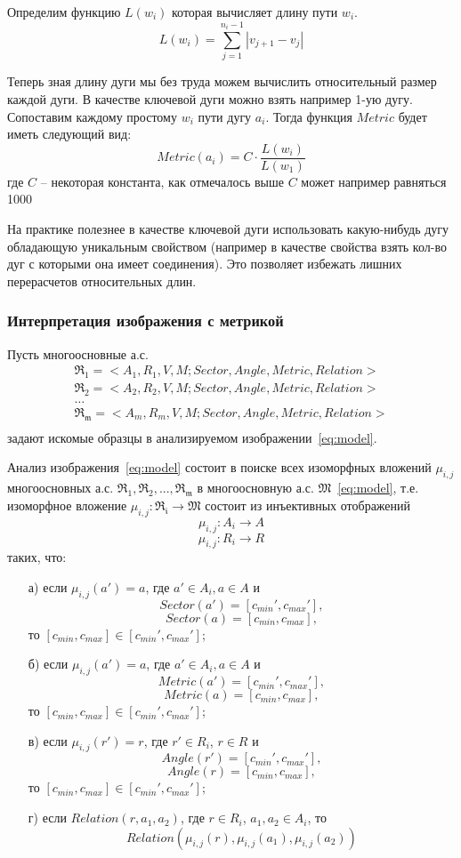 Определим функцию $L(w_i)$ которая вычисляет длину пути $w_i$.
$$L(w_i) = \sum\limits_{j=1}^{n_i-1}|v_{j+1}-v_j|$$

Теперь зная длину дуги мы без труда можем вычислить относительный размер каждой дуги. В качестве ключевой дуги можно взять например 1-ую дугу. Сопоставим каждому простому $w_i$ пути дугу $a_i$. Тогда функция $Metric$ будет иметь следующий вид:
$$Metric(a_i) = C\cdot\frac{L(w_i)}{L(w_1)}$$
где $C$ -- некоторая константа, как отмечалось выше $C$ может например равняться 1000

\begin{remark}
На практике полезнее в качестве ключевой дуги использовать какую-нибудь дугу обладающую уникальным свойством (например в качестве свойства взять кол-во дуг с которыми она имеет соединения). Это позволяет избежать лишних перерасчетов относительных длин. 
\end{remark}

\subsubsection{Интерпретация изображения с метрикой}
\noindent
Пусть многоосновные а.с.
\begin{equation}
	\begin{array}{c}
	\mathfrak{R_1}=<A_1, R_1, V, M; Sector, Angle, Metric, Relation> \\
	\mathfrak{R_2}=<A_2, R_2, V, M; Sector, Angle, Metric, Relation> \\
	\dots\\
	\mathfrak{R_m}=<A_m, R_m, V, M; Sector, Angle, Metric, Relation> \\
	\end{array}
	\label{templates_with_metrics}
\end{equation}
задают искомые образцы в анализируемом изображении~\ref{eq:model}.

Анализ изображения~\ref{eq:model} состоит в поиске всех изоморфных вложений ${ \mu_{i,j} }$ многоосновных а.с. $\mathfrak{R_1,R_2,...,R_m}$ в многоосновную а.с. $\mathfrak{M}$~\ref{eq:model}, т.е. изоморфное вложение $\mu_{i,j} : \mathfrak{R_i} \rightarrow \mathfrak{M}$ состоит из инъективных отображений
$$\mu_{i,j} : A_i \rightarrow A$$
$$\mu_{i,j} : R_i \rightarrow R$$
таких, что:
\begin{enumerate}
\item[а)] если $\mu_{i,j}(a') = a$, где $a' \in A_i, a \in A$ и 
$$Sector(a') = [c_{min}', c_{max}'],$$
$$Sector(a) = [c_{min}, c_{max}],$$
то $[c_{min}, c_{max}] \in [c_{min}', c_{max}']$;
\item[б)] если $\mu_{i,j}(a') = a$, где $a' \in A_i, a \in A$ и 
$$Metric(a') = [c_{min}', c_{max}'],$$
$$Metric(a) = [c_{min}, c_{max}],$$
то $[c_{min}, c_{max}] \in [c_{min}', c_{max}']$;
\item[в)] если $\mu_{i,j}(r') = r$, где $r' \in R_i$, $r \in R$ и 
$$Angle(r') =  [c_{min}', c_{max}'],$$
$$Angle(r) = [c_{min}, c_{max}],$$
то $[c_{min}, c_{max}] \in [c_{min}', c_{max}']$;
\item[г)] если $Relation(r, a_1, a_2)$, где $r \in R_i$, $a_1, a_2 \in A_i$, то 
$$Relation(\mu_{i,j}(r), \mu_{i,j}(a_1), \mu_{i,j}(a_2))$$
\end{enumerate}

